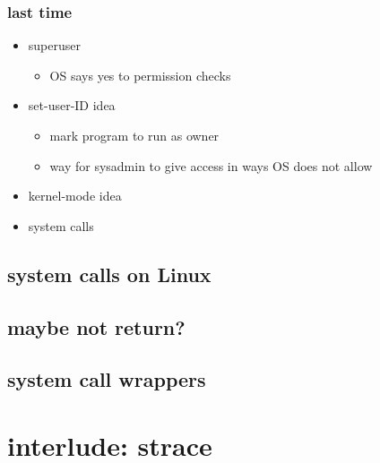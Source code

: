 \date{}
\title{}
\date{}

\begin{frame}
    \titlepage
\end{frame}



\begin{frame}
\frametitle{last time}
\begin{itemize}
\item superuser
    \begin{itemize}
    \item OS says yes to permission checks
    \end{itemize}
\item set-user-ID idea
    \begin{itemize}
    \item mark program to run as owner
    \item way for sysadmin to give access in ways OS does not allow
    \end{itemize}
\item kernel-mode idea
\item system calls
\end{itemize}
\end{frame}





\subsection{system calls on Linux}


\subsection{maybe not return?}



\subsection{system call wrappers}

% 

\section{interlude: strace}


